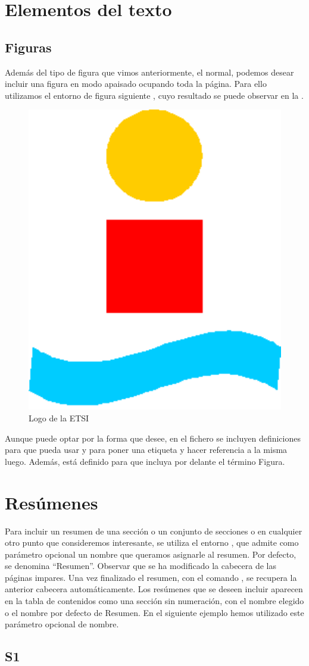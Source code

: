 \section{Elementos del texto}
%

\subsection{Figuras}

Además del tipo de figura que vimos anteriormente, el normal, podemos desear incluir una figura en modo apaisado ocupando toda la página. Para ello utilizamos el entorno de figura siguiente , cuyo resultado se puede observar en la . 

\begin{figure}
\centering
\includegraphics[width=3 cm]{capituloLibroETSI/figuras/logoESI.pdf}
\caption{Logo de la ETSI}
\end{figure}

Aunque puede optar por la forma que desee, en el fichero  se incluyen definiciones para que pueda usar  y  para poner una etiqueta y hacer referencia a la misma luego. Además, está definido para que  incluya por delante el término Figura.

\section{Resúmenes}%
Para incluir un resumen de una sección o un conjunto de secciones o en cualquier otro punto que consideremos interesante, se utiliza el entorno , que admite como parámetro opcional un nombre que queramos asignarle al resumen. Por defecto, se denomina ``Resumen''. Observar que se ha modificado la cabecera de las páginas impares. Una vez finalizado el resumen, con el comando , se recupera la anterior cabecera automáticamente. Los resúmenes que se deseen incluir aparecen en la tabla de contenidos como una sección sin numeración, con el nombre elegido o el nombre por defecto de Resumen. En el siguiente ejemplo hemos utilizado este parámetro opcional de nombre.

\begin{Resumen}


\subsection*{S1}

\end{Resumen}


